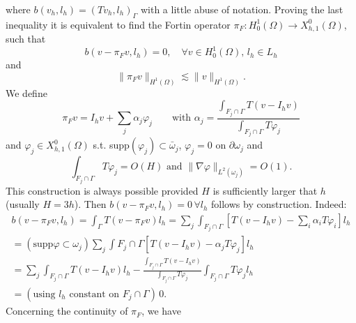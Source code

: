 where $b(v_h, l_h)=(Tv_h,l_h)_{\Gamma} $ with a little abuse of notation. 
Proving the last inequality it is equivalent to find the Fortin operator $\pi_F: H^1_0(\Omega) \rightarrow X_{h,1}^0(\Omega)$, such that 
\begin{equation*}
b(v-\pi_F v, l_h)=0, \quad \forall v\in H^1_0(\Omega), \, l_h \in L_h
\end{equation*} 
and
\begin{equation*}
\|\pi_F v\|_{H^1(\Omega)}\lesssim \|v\|_{H^1(\Omega)}.
\end{equation*} 
We define
\begin{equation*}
\pi_F v = I_h v + \sum _j \alpha _j \varphi _j \qquad \text{with }\alpha_j =\frac{\int_{F_j \cap \Gamma}T(v-I_hv)}{\int_{F_j \cap \Gamma}T\varphi _j}
\end{equation*}
and $\varphi_j \in X_{h,1}^0(\Omega)$ s.t. supp$(\varphi_j)\subset \bar{\omega}_j$, $\varphi_j =0$ on $\partial \omega _j$ and 
\begin{equation*}
 \int_{F_j\cap \Gamma}T\varphi_j=O(H) \text{ and } \|\nabla \varphi\|_{L^2(\omega _j)}=O(1). 
\end{equation*}
This construction is always possible provided $H$ is sufficiently larger that $h$ (usually $H=3h$).
Then $b(v-\pi_F v, l_h)=0 \, \forall l_h$ follows by construction. Indeed:
\begin{multline*}
b(v-\pi_F v, l_h)= \int_{\Gamma} T(v-\pi_Fv)l_h = \sum _j \int_{F_j\cap \Gamma} \left[ T(v-I_hv)-\sum _i \alpha_i T\varphi _i \right]l_h \\
=(\text{supp} \varphi \subset \omega_j) \sum _j \int{F_j\cap \Gamma} \left[ T(v-I_hv)-\alpha_j T\varphi _j \right]l_h\\
=\sum _j \int_{F_j\cap \Gamma} T(v-I_hv) l_h - \frac{\int_{F_j\cap \Gamma} T(v-I_hv)}{\int_{F_j\cap \Gamma}T\varphi_j} \int_{F_j\cap \Gamma}T\varphi _jl_h\\ 
=(\text{using $l_h$ constant on $F_j\cap \Gamma$})\,0.
\end{multline*}
Concerning the continuity of $\pi_F$, we have
